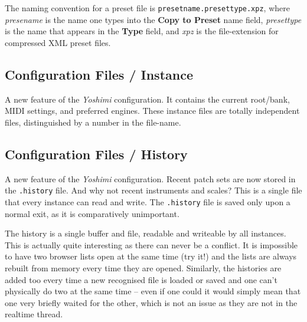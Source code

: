    The naming convention for a preset file is
   \texttt{presetname.presettype.xpz}, where
   \textsl{presename} is the name one types into the \textbf{Copy to Preset}
   name field, \textsl{presettype} is the name that appears in the
   \textbf{Type} field, and \textsl{xpz} is the file-extension for compressed
   XML preset files.


\subsection{Configuration Files / Instance}
\label{subsec:configuration_instance}

   A new feature of the \textsl{Yoshimi} configuration.
   It contains the current root/bank, MIDI settings, and preferred engines.
   These instance files are totally independent files, distinguished by a number
   in the file-name.

\subsection{Configuration Files / History}
\label{subsec:configuration_history}

   A new feature of the \textsl{Yoshimi} configuration.
   Recent patch sets are now stored in the \texttt{.history} file.
   And why not recent instruments and scales?
   This is a single file that every instance can read and write.
   The \texttt{.history} file is saved only upon a normal exit, as it is
   comparatively unimportant.

   The history is a single buffer and file, readable and writeable by all
   instances. This is actually quite interesting as there can never be a
   conflict.  It is impossible to have two browser lists open at the same time
   (try it!) and the lists are always rebuilt from memory every time they are
   opened. Similarly, the histories are added too every time a new recognised
   file is loaded or saved and one can't physically do two at the same time --
   even if one could it would simply mean that one very briefly waited for the
   other, which is not an issue as they are not in the realtime thread.

